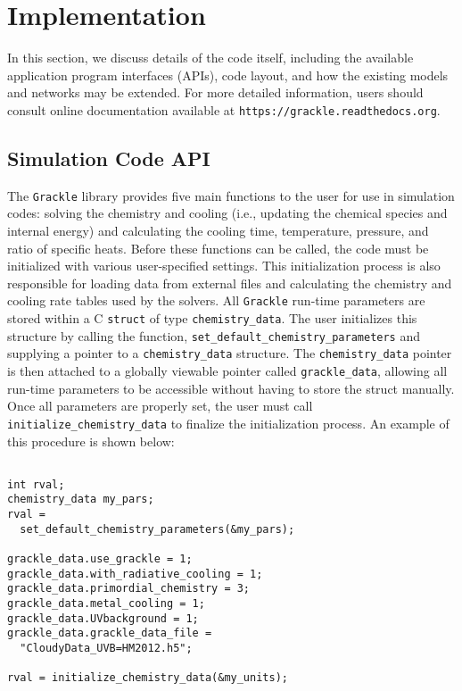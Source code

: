 \section{Implementation} \label{methods:code}

In this section, we discuss details of the code itself, including the
available application program interfaces (APIs), code layout, and how
the existing models and networks may be extended.  For more detailed
information, users should consult online documentation available at
\texttt{https://grackle.readthedocs.org}.

\subsection{Simulation Code API}

The \texttt{Grackle} library provides five main functions to the user for use
in simulation codes: solving the chemistry and cooling (i.e.,
updating the chemical species and internal energy) and calculating the
cooling time, temperature, pressure, and ratio of specific heats.
Before these functions can be called, the code must be initialized
with various user-specified settings.  This initialization process is
also responsible for loading data from external files and calculating
the chemistry and cooling rate tables used by the solvers.  All
\texttt{Grackle} run-time parameters are stored within a C \texttt{struct} of type
\texttt{chemistry\_data}.  The user initializes this structure by
calling the function, \texttt{set\_default\_chemistry\_parameters}
and supplying a pointer to a \texttt{chemistry\_data} structure.  The
\texttt{chemistry\_data} pointer is then attached to a globally
viewable pointer called \texttt{grackle\_data}, allowing all run-time
parameters to be accessible without having to store the struct
manually.  Once all parameters are properly set, the user must call
\texttt{initialize\_chemistry\_data} to finalize the initialization
process.  An example of this procedure is shown below:

\vspace{0.5cm}
\begin{minipage}[b]{0.5\linewidth}
\begin{verbatim}

int rval;
chemistry_data my_pars;
rval =
  set_default_chemistry_parameters(&my_pars);

grackle_data.use_grackle = 1;
grackle_data.with_radiative_cooling = 1;
grackle_data.primordial_chemistry = 3;
grackle_data.metal_cooling = 1;
grackle_data.UVbackground = 1;
grackle_data.grackle_data_file = 
  "CloudyData_UVB=HM2012.h5";

rval = initialize_chemistry_data(&my_units);

\end{verbatim}
\end{minipage}


